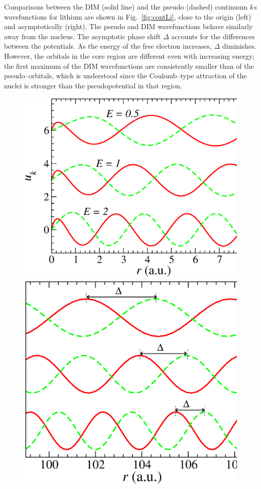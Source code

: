 \documentclass[10pt]{article}
\begin{document}
Comparisons between the DIM (solid line) and the pseudo (dashed)
continuum $ks$ wavefunctions for lithium are shown in 
Fig.~\ref{fig:contLi}, close to the origin (left) and asymptotically 
(right). The pseudo and DIM wavefunctions behave similarly away 
from the nucleus. The asymptotic phase shift $\Delta$ accounts for 
the differences between the potentials. As the energy of the free 
electron increases, $\Delta$ diminishes. However, the orbitals in the 
core region are different even with increasing energy; the first 
maximum of the DIM wavefunctions are consistently smaller than of the 
pseudo--orbitals, which is understood since the Coulomb--type 
attraction of the nuclei is stronger than the pseudopotential in that 
region. 
\begin{figure}[H]
\centering
\includegraphics[height=0.23\textheight]{figures/pseudopot/LicontA.eps}
\includegraphics[height=0.23\textheight]{figures/pseudopot/LicontB.eps}

\end{figure}
\end{document}

